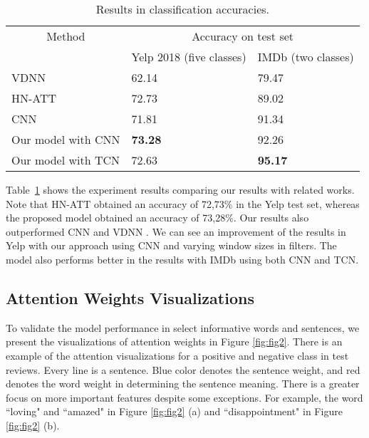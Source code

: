 \documentclass[runningheads]{llncs}
\begin{document}
\begin{table}[!h]
\caption{Results in classification accuracies.}
\centering
\begin{tabular}{@{}p{}*{2}{p{}}@{}}
\toprule
\multicolumn{1}{c}{Method} & \multicolumn{2}{c}{Accuracy on test set}  \\
\cmidrule(r{4pt}){2-3} 
& Yelp 2018 (five classes) & IMDb (two classes)  \\
\midrule
VDNN \cite{c31} & 62.14 & 79.47 \\
HN-ATT  \cite{c1} & 72.73 &  89.02 \\
CNN  \cite{c13} & 71.81 &  91.34 \\
Our model with CNN & \textbf{73.28} & 92.26\\
Our model with TCN & 72.63 & \textbf{95.17} \\
\bottomrule
\end{tabular}
\label{tabela1}
\end{table}

\vspace{-4mm}

Table~\ref{tabela1} shows the experiment results comparing our results with related works. Note that HN-ATT \cite{c1} obtained an accuracy of 72,73\% in the Yelp test set, whereas the proposed model obtained an accuracy of 73,28\%. Our results also outperformed CNN \cite{c1} and VDNN \cite{c31}. We can see an improvement of the results in Yelp with our approach using CNN and varying window sizes in filters. The model also performs better in the results with IMDb using both CNN and TCN.

\subsection{Attention Weights Visualizations}

To validate the model performance in select informative words and sentences, we present the visualizations of attention weights in Figure \ref{fig:fig2}. There is an example of the attention visualizations for a positive and negative class in test reviews. Every line is a sentence. Blue color denotes the sentence weight, and red denotes the word weight in determining the sentence meaning. There is a greater focus on more important features despite some exceptions. For example, the word ``loving" and ``amazed" in Figure \ref{fig:fig2} (a) and ``disappointment" in Figure \ref{fig:fig2} (b).
\end{document}
